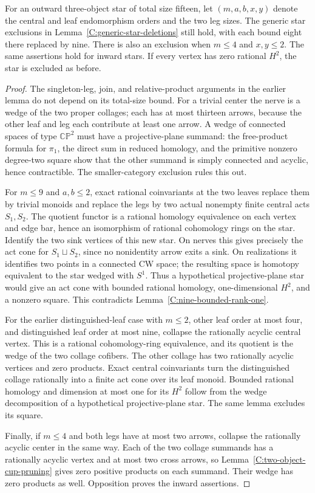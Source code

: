 \begin{lemma}
\label{C:fifteen-star-deletions}
For an outward three-object star of total size fifteen, let
$(m,a,b,x,y)$ denote the central and leaf endomorphism orders
and the two leg sizes.  The generic star exclusions in
Lemma~\ref{C:generic-star-deletions} still hold, with each
bound eight there replaced by nine.  There is also an exclusion
when $m\leq4$ and $x,y\leq2$.  The same assertions hold for
inward stars.  If every vertex has zero rational $H^2$, the
star is excluded as before.
\end{lemma}
\begin{proof}
The singleton-leg, join, and relative-product arguments in the
earlier lemma do not depend on its total-size bound.  For a trivial
center the nerve is a wedge of the two proper collages; each has
at most thirteen arrows, because the other leaf and leg each
contribute at least one arrow.  A wedge of connected spaces of
type $\mathbb{CP}^2$ must have a projective-plane summand: the
free-product formula for $\pi_1$, the direct sum in reduced
homology, and the primitive nonzero degree-two square show
that the other summand is simply connected and acyclic, hence
contractible.  The smaller-category exclusion rules this out.

For $m\leq9$ and $a,b\leq2$, exact rational coinvariants at
the two leaves replace them by trivial monoids and replace the
legs by two actual nonempty finite central acts $S_1,S_2$.
The quotient functor is a rational homology equivalence on each
vertex and edge bar, hence an isomorphism of rational cohomology
rings on the star.  Identify the two sink vertices of this new
star.  On nerves this gives precisely the act cone for
$S_1\sqcup S_2$, since no nonidentity arrow exits a sink.
On realizations it identifies two points in a connected CW space;
the resulting space is homotopy equivalent to the star wedged
with $S^1$.  Thus a hypothetical projective-plane star would
give an act cone with bounded rational homology, one-dimensional
$H^2$, and a nonzero square.  This contradicts
Lemma~\ref{C:nine-bounded-rank-one}.

For the earlier distinguished-leaf case with $m\leq2$, other
leaf order at most four, and distinguished leaf order at most
nine, collapse the rationally acyclic central vertex.
This is a rational cohomology-ring equivalence, and its quotient
is the wedge of the two collage cofibers.  The other collage
has two rationally acyclic vertices and zero products.
Exact central coinvariants turn the distinguished collage
rationally into a finite act cone over its leaf monoid.
Bounded rational homology and dimension at most one for its
$H^2$ follow from the wedge decomposition of a hypothetical
projective-plane star.  The same lemma excludes its square.

Finally, if $m\leq4$ and both legs have at most two arrows,
collapse the rationally acyclic center in the same way.
Each of the two collage summands has a rationally acyclic
vertex and at most two cross arrows, so
Lemma~\ref{C:two-object-cup-pruning} gives zero positive products
on each summand.  Their wedge has zero products as well.
Opposition proves the inward assertions.
\end{proof}
